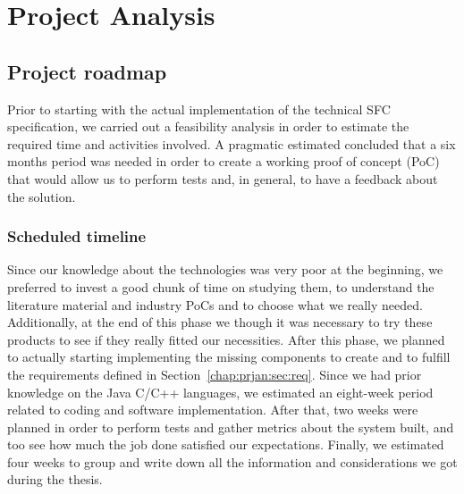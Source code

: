 \chapter{Project Analysis}
\label{chap:prjan}

\section{Project roadmap}
\label{chap:prjan:sec:prjsche}

Prior to starting with the actual implementation of the technical SFC
specification, we carried out a feasibility analysis in order to estimate the
required time and activities involved. A pragmatic estimated concluded that a
six months period was needed in order to create a working proof of concept
(PoC) that would allow us to perform tests and, in general, to have a feedback
about the solution.

\subsection{Scheduled timeline}
Since our knowledge about the technologies was very poor at the beginning, we
preferred to invest a good chunk of time on studying them, to understand the
literature material and industry PoCs and to choose what we really
needed. Additionally, at the end of this phase we though it was necessary to try
these products to see if they really fitted our necessities. After this phase,
we planned to actually starting implementing the missing components to create
and to fulfill the requirements defined in Section~\ref{chap:prjan:sec:req}.
Since we had prior knowledge on the Java C/C++ languages, we estimated an
eight-week period related to coding and software implementation.
After that, two weeks were planned in order to perform tests and gather metrics
about the system built, and too see how much the job done satisfied our
expectations. Finally, we estimated four weeks to group and write down all the
information and considerations we got during the thesis.

